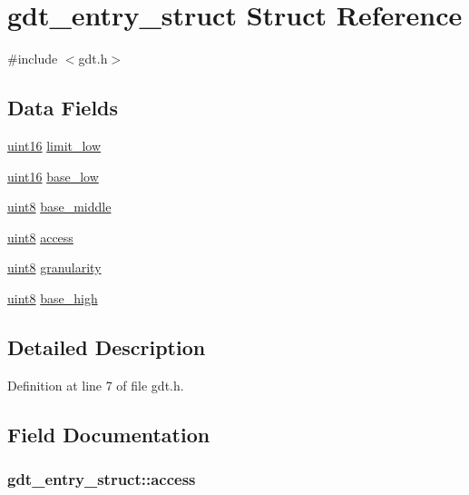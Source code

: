 \hypertarget{structgdt__entry__struct}{
\section{gdt\_\-entry\_\-struct Struct Reference}
\label{structgdt__entry__struct}
}


{\ttfamily \#include $<$gdt.h$>$}

\subsection*{Data Fields}
\begin{DoxyCompactItemize}
\item 
\hyperlink{int__types_8h_a05f6b0ae8f6a6e135b0e290c25fe0e4e}{uint16} \hyperlink{structgdt__entry__struct_a2d72f76609ed1e4900101767967ac195}{limit\_\-low}
\item 
\hyperlink{int__types_8h_a05f6b0ae8f6a6e135b0e290c25fe0e4e}{uint16} \hyperlink{structgdt__entry__struct_a7c96ac08a038dba0f1263dd0bff79e30}{base\_\-low}
\item 
\hyperlink{int__types_8h_adde6aaee8457bee49c2a92621fe22b79}{uint8} \hyperlink{structgdt__entry__struct_a22556a73f72b32b1088f4bfdfdc4fac5}{base\_\-middle}
\item 
\hyperlink{int__types_8h_adde6aaee8457bee49c2a92621fe22b79}{uint8} \hyperlink{structgdt__entry__struct_a2a55014b6728a0df80b4e04c9055d487}{access}
\item 
\hyperlink{int__types_8h_adde6aaee8457bee49c2a92621fe22b79}{uint8} \hyperlink{structgdt__entry__struct_ab1a59375bffe9bd70dcda6b97ebc4e62}{granularity}
\item 
\hyperlink{int__types_8h_adde6aaee8457bee49c2a92621fe22b79}{uint8} \hyperlink{structgdt__entry__struct_ae8d854fbc8e2c8544bc80d965a2aecd3}{base\_\-high}
\end{DoxyCompactItemize}


\subsection{Detailed Description}


Definition at line 7 of file gdt.h.



\subsection{Field Documentation}
\hypertarget{structgdt__entry__struct_a2a55014b6728a0df80b4e04c9055d487}{
\subsubsection[{access}]{ {\bf gdt\_\-entry\_\-struct::access}}}
\label{structgdt__entry__struct_a2a55014b6728a0df80b4e04c9055d487}


